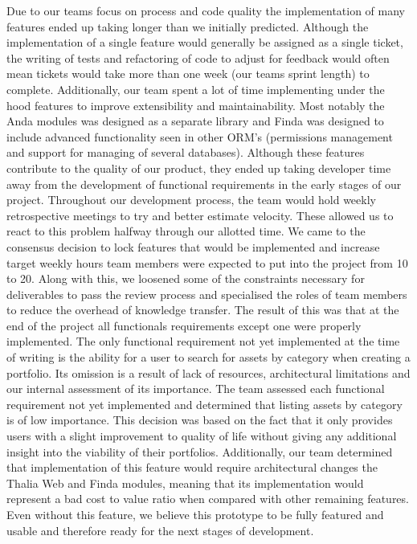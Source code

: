 \documentclass[main.tex]{subfiles}
\begin{document}
Due to our teams focus on process and code quality the implementation of many features ended up taking longer than we initially predicted. Although the implementation of a single feature would generally be assigned as a single ticket, the writing of tests and refactoring of code to adjust for feedback would often mean tickets would take more than one week (our teams sprint length) to complete. Additionally, our team spent a lot of time implementing under the hood features to improve extensibility and maintainability. Most notably the Anda modules was designed as a separate library and Finda was designed to include advanced functionality seen in other ORM’s (permissions management and support for managing of several databases). Although these features contribute to the quality of our product, they ended up taking developer time away from the development of functional requirements in the early stages of our project.
Throughout our development process, the team would hold weekly retrospective meetings to try and better estimate velocity. These allowed us to react to this problem halfway through our allotted time. We came to the consensus decision to lock features that would be implemented and increase target weekly hours team members were expected to put into the project from 10 to 20. Along with this, we loosened some of the constraints necessary for deliverables to pass the review process and specialised the roles of team members to reduce the overhead of knowledge transfer. The result of this was that at the end of the project all functionals requirements except one were properly implemented.
	The only functional requirement not yet implemented at the time of writing is the ability for a user to search for assets by category when creating a portfolio. Its omission is a result of lack of resources, architectural limitations and our internal assessment of its importance. The team assessed each functional requirement not yet implemented and determined that listing assets by category is of low importance. This decision was based on the fact that it only provides users with a slight improvement to quality of life without giving any additional insight into the viability of their portfolios. Additionally, our team determined that implementation of this feature would require architectural changes the Thalia Web and Finda modules, meaning that its implementation would represent a bad cost to value ratio when compared with other remaining features. 
Even without this feature, we believe this prototype to be fully featured and usable and therefore ready for the next stages of development.
\end{document}
